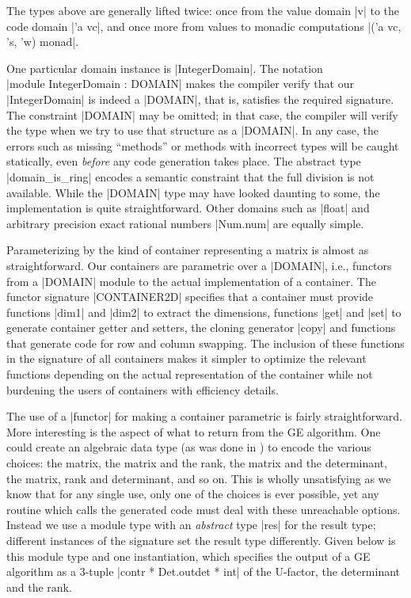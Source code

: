 \documentclass{llncs}
\begin{document}
\noindent  The types above are
generally lifted twice: once from the value domain |v| to the code
domain |'a vc|, and once more from values to monadic computations
|('a vc, 's, 'w) monad|. 

One particular domain instance is |IntegerDomain|. The notation\\
|module IntegerDomain : DOMAIN| makes the compiler verify that our
|IntegerDomain| is indeed a |DOMAIN|, that is, satisfies the required
signature. The constraint |DOMAIN| may be omitted; in that case, the
compiler will verify the type when we try to use that structure as a
|DOMAIN|. In any case, the errors such as missing ``methods'' or
methods with incorrect types will be caught statically, even
\emph{before} any code generation takes place. The abstract type
|domain_is_ring| encodes a semantic constraint that the full division
is not available. While the |DOMAIN| type may have looked daunting to
some, the implementation is quite straightforward.  Other domains such
as |float| and arbitrary precision exact rational numbers |Num.num|
are equally simple.

Parameterizing by the kind of container representing a matrix is
almost as straightforward.  Our containers are  parametric
over a |DOMAIN|, i.e., functors from a |DOMAIN| module
to the actual implementation of a container. The functor signature
|CONTAINER2D| specifies that a container must provide functions |dim1|
and |dim2| to extract the dimensions, functions |get| and |set| to
generate container getter and setters, the cloning generator |copy|
and functions that generate code for row and column swapping. The
inclusion of these functions in the signature of all containers makes
it simpler to optimize the relevant functions depending on the actual
representation of the container while not burdening the users of
containers with efficiency details. 

The use of a |functor| for making a container parametric is fairly
straightforward.  More interesting is the aspect of what to return
from the GE algorithm.  One could create an algebraic data type (as
was done in \cite{carette04}) to encode the various choices: the
matrix, the matrix and the rank, the matrix and the determinant, the
matrix, rank and determinant, and so on. This is wholly unsatisfying
as we know that for any single use, only one of the choices is ever
possible, yet any routine which calls the generated code must deal
with these unreachable options.  Instead we use a module type with an
\emph{abstract} type |res| for the result type; different instances of
the signature set the result type differently. Given below is this
module type and one instantiation, which specifies the output of a GE
algorithm as a 3-tuple |contr * Det.outdet * int| of the U-factor, the
determinant and the rank.
\end{document}
